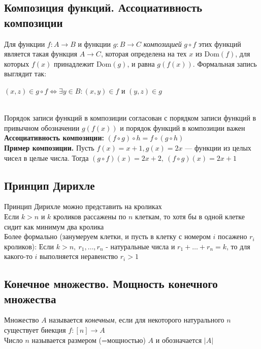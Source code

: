 \documentclass[a4paper]{article}
\begin{document}
\subsection{Композиция функций. Ассоциативность композиции}
Для функции $f: A\rightarrow B$ и функции $g: B\rightarrow C$ \textit{композицией} $g\circ f$ этих функций является такая функция $A\rightarrow C$, которая определена на тех $x$ из Dom$(f)$, для которых $f(x)$ принадлежит Dom$(g)$, и равна $g(f(x))$. Формальная запись выглядит так:\\[2mm]
\centerline{$(x,z)\in g\circ f\Leftrightarrow\exists y\in B: (x,y)\in f$ и $(y,z)\in g$}\\[2mm]
\indent Порядок записи функций в композиции согласован с порядком записи функций
в привычном обозначении $g(f(x))$ и порядок функций в композиции важен\\[2mm]
\indent \textbf{Ассоциативность композиции:} $(f\circ g)\circ h=f\circ (g\circ h)$\\[2mm]
\indent \textbf{Пример композиции.} Пусть $f(x)=x+1, g(x)=2x$ — функции из целых чисел в целые
числа. Тогда $(g\circ f)(x)=2x+2,\ (f\circ g)(x)=2x+1$
\subsection{Принцип Дирихле}
Принцип Дирихле можно представить на кроликах\\[2mm]
\indent Если $k>n$ и $k$ кроликов рассажены по $n$ клеткам, то хотя бы в одной клетке сидит как минимум два кролика\\[2mm]
\indent Более формально (занумеруем клетки, и пусть в клетку с номером $i$ посажено $r_i$ кроликов): Если $k>n,\ r_1,\ldots,r_n$ - натуральные числа и $r_1+\ldots+r_n=k$, то для какого-то $i$ выполняется неравенство $r_i>1$
\subsection{Конечное множество. Мощность конечного множества}
\label{sec:intro}
Множество $A$ называется \textit{конечным}, если для некоторого натурального $n$ существует биекция $f: [n]\rightarrow A$\\[2mm]
Число $n$ называется размером (=мощностью) $A$ и обозначается $|A|$
\end{document}
